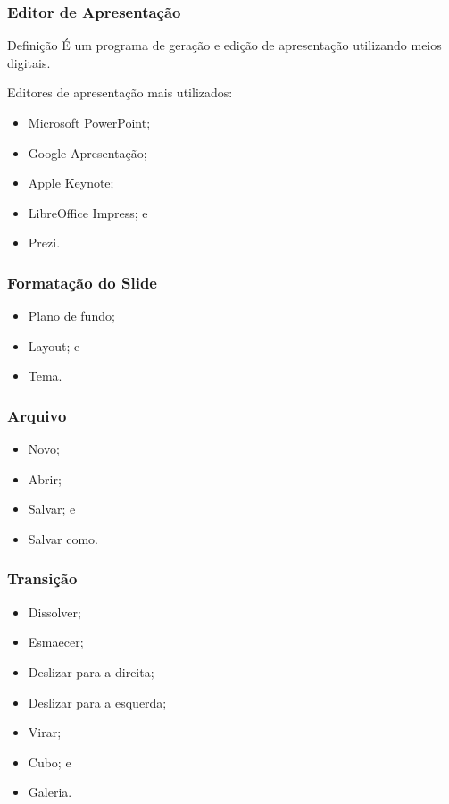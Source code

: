 \documentclass[aspectratio=169]{beamer} %
\begin{document}
\begin{frame}
	\frametitle{Editor de Apresenta\c cão}
	
	\begin{block}{Defini\c cão}
		É um programa de  geração e edição de apresentação utilizando meios digitais.
	\end{block} \vfill
		
	Editores de apresenta\c cão mais utilizados:
	\begin{itemize}
		\item Microsoft PowerPoint;
		\item Google Apresenta\c cão;
		\item Apple Keynote;
		\item LibreOffice Impress; e
		\item Prezi.
	\end{itemize}
\end{frame}

\begin{frame}
	\frametitle{Formata\c cão do Slide}
			
	\begin{itemize}
		\item Plano de fundo;
		\item Layout; e
		\item Tema.
	\end{itemize}
\end{frame}

\begin{frame}
	\frametitle{Arquivo}
			
	\begin{itemize}
		\item Novo;
		\item Abrir;
		\item Salvar; e
		\item Salvar como.
	\end{itemize}
\end{frame}

\begin{frame}
	\frametitle{Transi\c cão}
			
	\begin{itemize}
		\item Dissolver;
		\item Esmaecer;
		\item Deslizar para a direita;
		\item Deslizar para a esquerda;
		\item Virar;
		\item Cubo; e
		\item Galeria.
	\end{itemize}
\end{frame}
\end{document}
